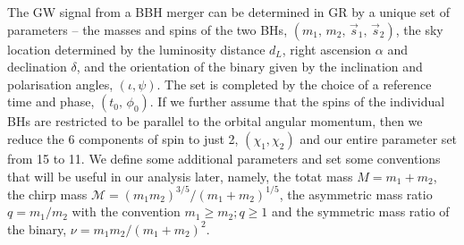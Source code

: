 \documentclass[twocolumn,prd,aps,superscriptaddress,preprintnumbers,tightenlines,showpacs,nofootinbib,eqsecnum,amsfonts,amsmath,longbibliography]{revtex4-1}
\begin{document}
The GW signal from a BBH merger can be determined in GR by a unique set of parameters -- the masses and spins of the two BHs, $(m_1,\, m_2,\, \vec{s}_1,\, \vec{s}_2)$, the sky location determined by the luminosity distance $d_L$, right ascension $\alpha$ and declination $\delta$, and the orientation of the binary given by the inclination and polarisation angles, $(\iota, \psi)$. The set is completed by the choice of a reference time and phase, $(t_0,\, \phi_0)$. If we further assume that the spins of the individual BHs are restricted to be parallel to the orbital angular momentum, then we reduce the 6 components of spin to just 2, $(\chi_1, \chi_2)$ and our entire parameter set from 15 to 11. We define some additional parameters and set some conventions that will be useful in our analysis later, namely, the totat mass $M=m_1+m_2$, the chirp mass $\mathcal {M}=(m_{1}m_{2})^{3/5}/(m_{1}+m_{2})^{1/5}$, the asymmetric mass ratio $q=m_1/m_2$ with the convention $m_1 \geqslant m_2; q \geqslant 1$ and the symmetric mass ratio of the binary, $\nu = m_1m_2/(m_1+m_2)^2$.
\end{document}
